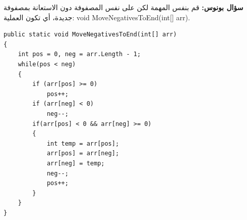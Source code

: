 \documentclass[14pt]{extarticle}
\begin{document}
\begin{enumerate}[itemsep=2em]
    {\large\textbf{سؤال بونوس:}} قم بنفس المهمة لكن على نفس المصفوفة دون الاستعانة بمصفوفة جديدة، أي تكون العملية: \textenglish{void MoveNegativesToEnd(int[] arr)}.
    \ifwithsols
    \begin{boxSolution}[البونوس]
    \begin{english}
    \begin{verbatim}
public static void MoveNegativesToEnd(int[] arr)
{
    int pos = 0, neg = arr.Length - 1;
    while(pos < neg)
    {
        if (arr[pos] >= 0)
            pos++;
        if (arr[neg] < 0)
            neg--;
        if(arr[pos] < 0 && arr[neg] >= 0)
        {
            int temp = arr[pos];
            arr[pos] = arr[neg];
            arr[neg] = temp;
            neg--;
            pos++;
        }
    }
}
    \end{verbatim}
    \end{english}
    \end{boxSolution}
    \fi
\end{enumerate}
\end{document}
